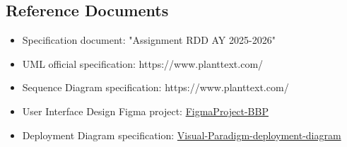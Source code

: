 \subsection{Reference Documents}
\begin{itemize}
    \item Specification document: "Assignment RDD AY 2025-2026"
    
    \item UML official specification: https://www.planttext.com/
    
    \item Sequence Diagram specification: https://www.planttext.com/
    
    \item User Interface Design Figma project:
    \href{https://www.figma.com/design/Eke18Kn9sdAbKgfQLGRc6u/BBP?node-id=0-1&p=f&t=du3CXIlhp8B1eogT-0}{FigmaProject-BBP}
    
    \item Deployment Diagram specification: 
    \href{https://online.visual-paradigm.com/diagrams/tutorials/deployment-diagram-tutorial/}{Visual-Paradigm-deployment-diagram}
    
\end{itemize}

